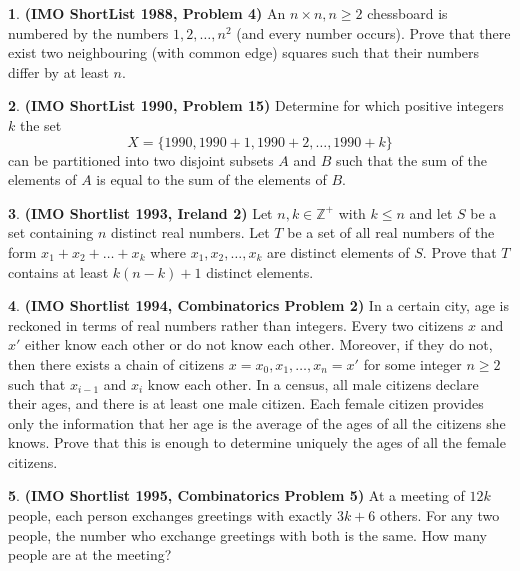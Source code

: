 \documentclass{article}
\newcommand{\plus}{+}
\newcommand{\minus}{-}
\newcommand{\equal}{=}
\theoremstyle{definition}
\newtheorem{p}{}
\begin{document}
\begin{p}{\bf (IMO ShortList 1988, Problem 4)}
An $ n \times n, n \geq 2$ chessboard is numbered by the numbers $ 1, 2, \ldots, n^2$ (and every number occurs). Prove that there exist two neighbouring (with common edge) squares such that their numbers differ by at least $ n.$
\end{p}



\begin{p}{\bf (IMO ShortList 1990, Problem 15)}
Determine for which positive integers $ k$ the set \[ X \equal{} \{1990, 1990 \plus{} 1, 1990 \plus{} 2, \ldots, 1990 \plus{} k\}\] can be partitioned into two disjoint subsets $ A$ and $ B$ such that the sum of the elements of $ A$ is equal to the sum of the elements of $ B.$
\end{p}





\begin{p}{\bf (IMO Shortlist 1993, Ireland 2)}
Let $n,k \in \mathbb{Z}^{+}$ with $k \leq n$ and let $S$ be a set containing $n$ distinct real numbers. Let $T$ be a set of all real numbers of the form $x_1 + x_2 + \ldots + x_k$ where $x_1, x_2, \ldots, x_k$ are distinct elements of $S.$ Prove that $T$ contains at least $k(n-k)+1$ distinct elements.
\end{p}


\begin{p}{\bf (IMO Shortlist 1994, Combinatorics Problem 2)}
In a certain city, age is reckoned in terms of real numbers rather than integers. Every two citizens $ x$ and $ x'$ either know each other or do not know each other. Moreover, if they do not, then there exists a chain of citizens $ x \equal{} x_0, x_1, \ldots, x_n \equal{} x'$ for some integer $ n \geq 2$ such that $ x_{i\minus{}1}$ and $ x_i$ know each other. In a census, all male citizens declare their ages, and there is at least one male citizen. Each female citizen provides only the information that her age is the average of the ages of all the citizens she knows. Prove that this is enough to determine uniquely the ages of all the female citizens.
\end{p}




\begin{p}{\bf (IMO Shortlist 1995, Combinatorics Problem 5)}
At a meeting of $ 12k$ people, each person exchanges greetings with exactly $ 3k\plus{}6$ others. For any two people, the number who exchange greetings with both is the same. How many people are at the meeting?
\end{p}
\end{document}
